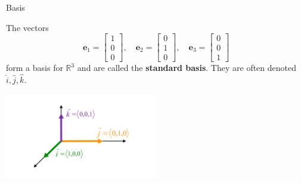 \documentclass{beamer}
\begin{document}
\begin{frame}{Basis}

  \begin{example}
    The vectors
    \[
    \mathbf{e}_1 = \begin{bmatrix} 1 \\ 0 \\ 0 \end{bmatrix}, \quad \mathbf{e}_2 = \begin{bmatrix} 0 \\ 1 \\ 0 \end{bmatrix}, \quad \mathbf{e}_3 = \begin{bmatrix} 0 \\ 0 \\ 1 \end{bmatrix}
    \]
    form a basis for $\mathbb{R}^3$ and are called the \textbf{standard basis}. They are often denoted $\hat{i}, \hat{j}, \hat{k}$.
  \end{example}
      \begin{center}
    \includegraphics[width=0.5\textwidth, height=\textheight, keepaspectratio]{ijk.png}
  \end{center}
    
\end{frame}
\end{document}
